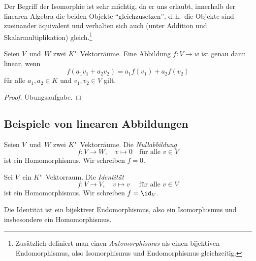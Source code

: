 \documentclass[a4paper]{article}
\begin{document}
Der Begriff der Isomorphie ist sehr mächtig, da er uns erlaubt, innerhalb der linearen Algebra die beiden Objekte "`gleichzusetzen"', d.\,h.\ die Objekte sind zueinander äquivalent und verhalten sich auch (unter Addition und Skalarmultiplikation) gleich.\footnote{Zusätzlich definiert man einen \emph{Automorphismus} als einen bijektiven Endomorphismus, also Isomorphismus und Endomorphismus gleichzeitig.}

\begin{lemma}\label{lem:hom:def}
    Seien $V$~und~$W$ zwei $K$"~Vektorräume. Eine Abbildung $f\colon V \to w$ ist genau dann linear, wenn
    \begin{equation*}
        f(a_1v_1 + a_2v_2) = a_1f(v_1) + a_2f(v_2)
    \end{equation*}
    für alle $a_1,a_2 \in K$ und $v_1,v_2 \in V$ gilt.
\end{lemma}

\begin{proof}
    Übungsaufgabe.
\end{proof}

\subsection{Beispiele von linearen Abbildungen}

\begin{definition}[Nullabbildung]
    Seien $V$~und~$W$ zwei $K$"~Vektorräume. Die \emph{Nullabbildung}
    \begin{equation*}
        f\colon V \to W,\quad v \mapsto 0 \quad\text{für alle } v \in V
    \end{equation*}
    ist ein Homomorphismus. Wir schreiben $f = 0$.
\end{definition}

\begin{definition}[Identität]
    Sei $V$~ein $K$"~Vektorraum. Die \emph{Identität}
    \begin{equation*}
        f\colon V \to V,\quad v \mapsto v \quad\text{ für alle } v \in V
    \end{equation*}
    ist ein Homomorphismus. Wir schreiben $f = \id_V$.
\end{definition}

Die Identität ist ein bijektiver Endomorphismus, also ein Isomorphismus und insbesondere ein Homomorphismus.
\end{document}
